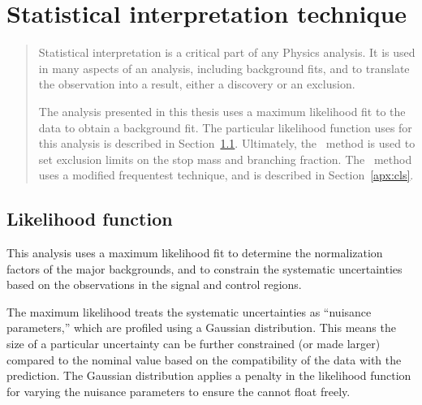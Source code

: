 \chapter[Statistical interpretation technique][Statistical interpretation]
        {Statistical interpretation technique}
\label{apx:stat_interpretation}

\begin{quote}
  Statistical interpretation is a critical part of any Physics analysis.
  It is used in many aspects of an analysis, including background fits,
  and to translate the observation into a result, either a discovery
  or an exclusion.

  The analysis presented in this thesis uses a maximum likelihood fit to the
  data to obtain a background fit.
  The particular likelihood function uses for this analysis is described in
  Section~\ref{apx:likelihood}.
  Ultimately, the \cls\ method is used to set exclusion limits on the stop
  mass and branching fraction.
  The \cls\ method uses a modified frequentest technique, and is described
  in Section~\ref{apx:cls}.
\end{quote}

\section{Likelihood function}
\label{apx:likelihood}

This analysis uses a maximum likelihood fit to determine the normalization
factors of the major backgrounds, and to constrain the systematic uncertainties
based on the observations in the signal and control regions.

The maximum likelihood treats the systematic uncertainties as ``nuisance
parameters,'' which are profiled using a Gaussian distribution.
This means the size of a particular uncertainty can be further
constrained (or made larger) compared to the nominal value based on the
compatibility of the data with the prediction.
The Gaussian distribution applies a penalty in the likelihood function for
varying the nuisance parameters to ensure the cannot float freely.

